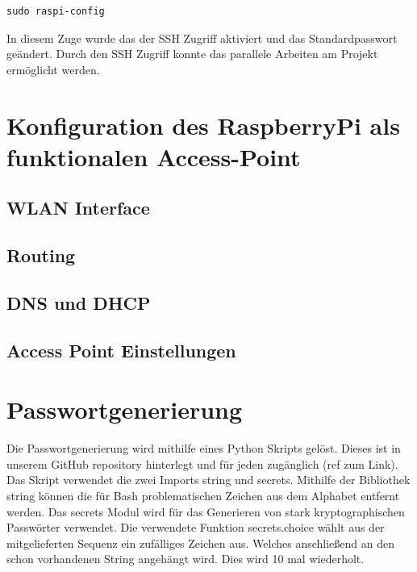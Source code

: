 \documentclass[a4paper,11pt,singlespacing]{article}
\begin{document}
        \begin{lstlisting}
sudo raspi-config
        \end{lstlisting} 
    	
        In diesem Zuge wurde das der SSH Zugriff aktiviert und das Standardpasswort geändert. Durch den SSH Zugriff konnte das parallele Arbeiten am Projekt ermöglicht werden. 
    	
    	\section{Konfiguration des RaspberryPi als funktionalen Access-Point}
            \subsection{WLAN Interface}
            \subsection{Routing}
            \subsection{DNS und DHCP}
            \subsection{Access Point Einstellungen}
         
            
    	\section{Passwortgenerierung}
    		Die Passwortgenerierung wird mithilfe eines Python Skripts gelöst. Dieses ist in unserem GitHub repository hinterlegt und für jeden zugänglich (ref zum Link). Das Skript verwendet die zwei Imports string und secrets. Mithilfe der Bibliothek string können die für Bash problematischen Zeichen aus dem Alphabet entfernt werden. Das secrets Modul wird für das Generieren von stark kryptographischen Passwörter verwendet. Die verwendete Funktion secrets.choice wählt aus der mitgelieferten Sequenz ein zufälliges Zeichen aus. Welches anschließend an den schon vorhandenen String angehängt wird. Dies wird 10 mal wiederholt.
    	
    	
\end{document}
